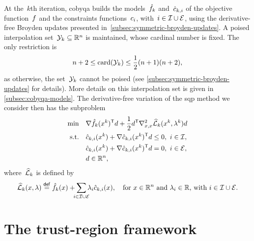At the~$k$th iteration, \gls{cobyqa} builds the models~$\objm[k]$ and~$\conm[k]{i}$ of the objective function~$f$ and the constraints functions~$c_{i}$, with~$i \in \mathcal{I} \cup \mathcal{E}$, using the derivative-free Broyden updates presented in~\cref{subsec:symmetric-broyden-updates}.
A poised interpolation set~$\xpt[k] \subseteq \R^n$ is maintained, whose cardinal number is fixed.
The only restriction is
\begin{equation*}
    n + 2 \le \card(\xpt[k]) \le \frac{1}{2} (n + 1) (n + 2),
\end{equation*}
as otherwise, the set~$\xpt[k]$ cannot be poised (see \cref{subsec:symmetric-broyden-updates} for details).
More details on this interpolation set is given in \cref{subsec:cobyqa-models}.
The derivative-free variation of the \gls{sqp} method we consider then has the subproblem
\begin{align*}
    \min        & \quad \nabla \objm[k](x^k)^{\T} d + \frac{1}{2} d^{\T} \nabla_{x, x}^2 \lagm[k](x^k, \lambda^k) d\\
    \text{s.t.} & \quad \conm[k]{i}(x^k) + \nabla \conm[k]{i}(x^k)^{\T} d \le 0, ~ i \in \iub,\\
                & \quad \conm[k]{i}(x^k) + \nabla \conm[k]{i}(x^k)^{\T} d = 0, ~ i \in \ieq,\\
                & \quad d \in \R^n,
\end{align*}
where~$\lagm[k]$ is defined by
\begin{equation*}
    \lagm[k](x, \lambda) \eqdef \objm[k](x) + \sum_{\mathclap{i \in \iub \cup \ieq}} \lambda_i \conm[k]{i}(x), \quad \text{for~$x \in \R^n$ and~$\lambda_i \in \R$, with~$i \in \iub \cup \ieq$}.
\end{equation*}

\section{The trust-region framework}

